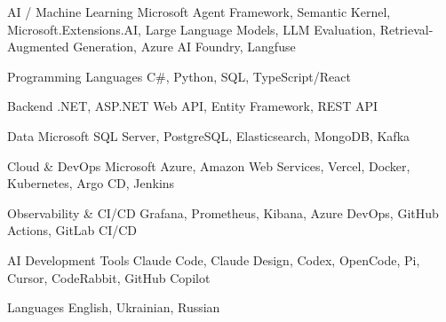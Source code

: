 

\begin{cvskills}

  \cvskill
    {AI / Machine Learning} %
    {Microsoft Agent Framework, Semantic Kernel, Microsoft.Extensions.AI, Large Language Models, LLM Evaluation, Retrieval-Augmented Generation, Azure AI Foundry, Langfuse} %

  \cvskill
    {Programming Languages} %
    {C\#, Python, SQL, TypeScript/React} %

  \cvskill
    {Backend} %
    {.NET, ASP.NET Web API, Entity Framework, REST API} %

  \cvskill
    {Data} %
    {Microsoft SQL Server, PostgreSQL, Elasticsearch, MongoDB, Kafka} %

  \cvskill
    {Cloud \& DevOps} %
    {Microsoft Azure, Amazon Web Services, Vercel, Docker, Kubernetes, Argo CD, Jenkins} %

  \cvskill
    {Observability \& CI/CD} %
    {Grafana, Prometheus, Kibana, Azure DevOps, GitHub Actions, GitLab CI/CD} %

  \cvskill
    {AI Development Tools} %
    {Claude Code, Claude Design, Codex, OpenCode, Pi, Cursor, CodeRabbit, GitHub Copilot} %

  \cvskill
    {Languages} %
    {English, Ukrainian, Russian} %

\end{cvskills}
